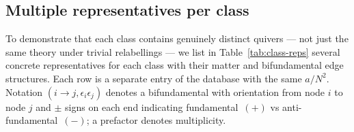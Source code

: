 \subsection{Multiple representatives per class}
\label{sec:class-representatives}

To demonstrate that each class contains genuinely distinct quivers
--- not just the same theory under trivial relabellings --- we list
in Table~\ref{tab:class-reps} several concrete representatives for
each class with their matter and bifundamental edge structures.
Each row is a separate entry of the database with the same
$a/N^{2}$.  Notation $(i\to j,\epsilon_{i}\epsilon_{j})$ denotes a
bifundamental with orientation from node $i$ to node $j$ and $\pm$
signs on each end indicating fundamental~$(+)$ vs
anti-fundamental~$(-)$; a prefactor denotes multiplicity.

